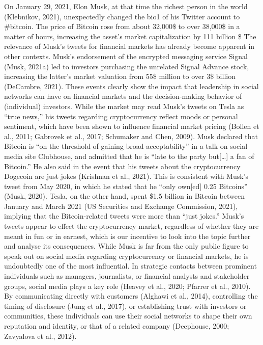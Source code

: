 \documentclass[
]{article}
\begin{document}
On January 29, 2021, Elon Musk, at that time the richest person in the
world (Klebnikov, 2021), unexpectedly changed the bio1 of his Twitter
account to \#bitcoin. The price of Bitcoin rose from about 32,000\$ to
over 38,000\$ in a matter of hours, increasing the asset's market
capitalization by 111 billion \$ The relevance of Musk's tweets for
financial markets has already become apparent in other contexts. Musk's
endorsement of the encrypted messaging service Signal (Musk, 2021a) led
to investors purchasing the unrelated Signal Advance stock, increasing
the latter's market valuation from 55\$ million to over 3\$ billion
(DeCambre, 2021). These events clearly show the impact that leadership
in social networks can have on financial markets and the decision-making
behavior of (individual) investors. While the market may read Musk's
tweets on Tesla as ``true news,'' his tweets regarding cryptocurrency
reflect moods or personal sentiment, which have been shown to influence
financial market pricing (Bollen et al., 2011; Gabrovek et al., 2017;
Schumaker and Chen, 2009). Musk declared that Bitcoin is ``on the
threshold of gaining broad acceptability'' in a talk on social media
site Clubhouse, and admitted that he is ``late to the party
but{[}\ldots{]} a fan of Bitcoin.'' He also said in the event that his
tweets about the cryptocurrency Dogecoin are just jokes (Krishnan et
al., 2021). This is consistent with Musk's tweet from May 2020, in which
he stated that he ``only own{[}ed{]} 0.25 Bitcoins'' (Musk, 2020).
Tesla, on the other hand, spent \$1.5 billion in Bitcoin between January
and March 2021 (US Securities and Exchange Commission, 2021), implying
that the Bitcoin-related tweets were more than ``just jokes.'' Musk's
tweets appear to effect the cryptocurrency market, regardless of whether
they are meant in fun or in earnest, which is our incentive to look into
the topic further and analyse its consequences. While Musk is far from
the only public figure to speak out on social media regarding
cryptocurrency or financial markets, he is undoubtedly one of the most
influential. In strategic contacts between prominent individuals such as
managers, journalists, or financial analysts and stakeholder groups,
social media plays a key role (Heavey et al., 2020; Pfarrer et al.,
2010). By communicating directly with customers (Alghawi et al., 2014),
controlling the timing of disclosure (Jung et al., 2017), or
establishing trust with investors or communities, these individuals can
use their social networks to shape their own reputation and identity, or
that of a related company (Deephouse, 2000; Zavyalova et al., 2012).
\end{document}

